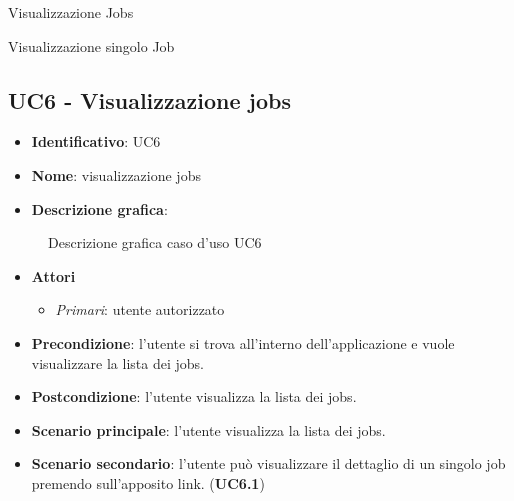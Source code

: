 \begin{usecase}{6}{Visualizzazione Jobs}
  \label{uc:visualizzazione-jobs}
\end{usecase}
\begin{usecase}{7}{Visualizzazione singolo Job}
  \label{uc:visualizzazione-job}
\end{usecase}


\subsection{UC6 - Visualizzazione jobs}
\begin{itemize}
  \item \textbf{Identificativo}: UC6
  \item \textbf{Nome}: visualizzazione jobs
  \item \textbf{Descrizione grafica}:
\end{itemize}

\begin{figure}[h]
  \centering
  \caption{Descrizione grafica caso d'uso UC6}
\end{figure}

\begin{itemize}
  \item \textbf{Attori}
        \begin{itemize}
          \item \textit{Primari}: utente autorizzato
        \end{itemize}
  \item \textbf{Precondizione}: l'utente si trova all'interno dell'applicazione e vuole visualizzare la lista dei jobs.
  \item \textbf{Postcondizione}: l'utente visualizza la lista dei jobs.
  \item \textbf{Scenario principale}: l'utente visualizza la lista dei jobs.
  \item \textbf{Scenario secondario}: l'utente può visualizzare il dettaglio di un singolo job premendo sull'apposito link. (\textbf{UC6.1})
\end{itemize}

